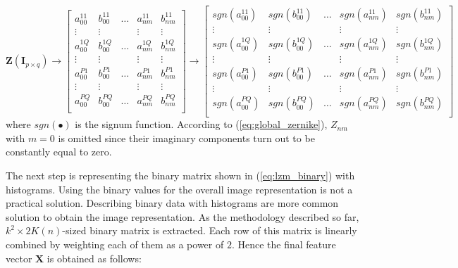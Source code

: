\documentclass[]{spie}  %
\begin{document}
\begin{equation}
\mathbf{Z} ( \mathbf{I}_{p\times q} )
 \longrightarrow
 \begin{bmatrix}
a_{00}^{11} & b_{00}^{11} & \hdots & a_{nm}^{11}  & b_{nm}^{11} \\
  \vdots  & \vdots & & \vdots  & \vdots\\
a_{00}^{1Q} & b_{00}^{1Q} & \hdots & a_{nm}^{1Q}  & b_{nm}^{1Q} \\
  \vdots  & \vdots & & \vdots  & \vdots\\
a_{00}^{P1} & b_{00}^{P1} & \hdots & a_{nm}^{P1}  & b_{nm}^{P1} \\
  \vdots  & \vdots & & \vdots  & \vdots\\
a_{00}^{PQ} & b_{00}^{PQ} & \hdots & a_{nm}^{PQ}  & b_{nm}^{PQ} \\
 \end{bmatrix}
  \longrightarrow
  \begin{bmatrix}
sgn(a_{00}^{11}) & sgn(b_{00}^{11}) & \hdots & sgn(a_{nm}^{11}) & sgn(b_{nm}^{11}) \\
  \vdots  & \vdots & & \vdots  & \vdots\\
sgn(a_{00}^{1Q}) & sgn(b_{00}^{1Q}) & \hdots & sgn(a_{nm}^{1Q}) & sgn(b_{nm}^{1Q}) \\
  \vdots  & \vdots & & \vdots  & \vdots\\
sgn(a_{00}^{P1}) & sgn(b_{00}^{P1}) & \hdots & sgn(a_{nm}^{P1}) & sgn(b_{nm}^{P1}) \\
  \vdots  & \vdots & & \vdots  & \vdots\\
sgn(a_{00}^{PQ}) & sgn(b_{00}^{PQ}) & \hdots & sgn(a_{nm}^{PQ}) & sgn(b_{nm}^{PQ}) \\
 \end{bmatrix}
 \label{eq:lzm_binary}
\end{equation}
where $sgn(\bullet)$ is the signum function. According to (\ref{eq:global_zernike}), $Z_{nm}$ with $m = 0$ is omitted since their imaginary components turn out to be constantly equal to zero. 

The next step is representing the binary matrix shown in (\ref{eq:lzm_binary}) with histograms. Using the binary values for the overall image representation is not a practical solution. Describing binary data with histograms are more common solution to obtain the image representation. As the methodology described so far, $k^2\times 2K(n)$-sized binary matrix is extracted. Each row of this matrix is linearly combined by weighting each of them as a power of $2$. Hence the final feature vector $\mathbf{X}$ is obtained as follows:
\end{document}
